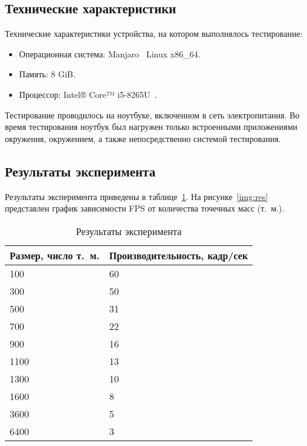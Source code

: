 \subsection{Технические характеристики}

Технические характеристики устройства, на котором выполнялось тестирование:

\begin{itemize}
	\item Операционная система: Manjaro~\cite{manjaro} Linux x86\_64.
	\item Память: 8 GiB.
	\item Процессор: Intel® Core™ i5-8265U~\cite{intel}.
\end{itemize}

Тестирование проводилось на ноутбуке, включенном в сеть электропитания. Во
время тестирования ноутбук был нагружен только встроенными приложениями
окружения, окружением, а также непосредственно системой тестирования.

\subsection{Результаты эксперимента}

Результаты эксперимента приведены в таблице~\ref{tab:01}. На
рисунке~\ref{img:res} представлен график зависимости FPS от количества точечных
масс (т.~м.).

\noindent
\captionsetup{format=hang,justification=raggedright,
              singlelinecheck=off,width=14cm}
\begin{longtable}[Hc]{|l|l|}
\caption{Результаты эксперимента\label{tab:01}}\\
    \hline
    \multicolumn{1}{|c|}{\textbf{Размер, число т.~м.}}
    &
    \multicolumn{1}{c|}{\textbf{Производительность, кадр/сек}}\\
    \hline
    100 & 60 \\
    \hline
    300 & 50 \\
    \hline
    500 & 31 \\
    \hline
    700 & 22 \\
    \hline
    900 & 16 \\
    \hline
    1100 & 13 \\
    \hline
    1300 & 10 \\
    \hline
    1600 & 8 \\
    \hline
    3600 & 5 \\
    \hline
    6400 & 3 \\
    \hline
\end{longtable}

